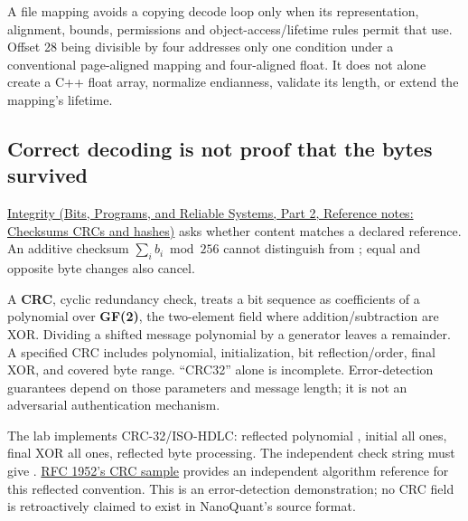 A file mapping avoids a copying decode loop only when its representation, alignment, bounds, permissions and object-access/lifetime rules permit that use. Offset 28 being divisible by four addresses only one condition under a conventional page-aligned mapping and four-aligned float. It does not alone create a C++ float array, normalize endianness, validate its length, or extend the mapping's lifetime.

\subsection{Correct decoding is not proof that the bytes survived}\label{05-engine-i-ch002-correct-decoding-is-not-proof-that-the-bytes-survived}

\hypertarget{05-engine-i-ch002-correct-decoding-is-not-proof-that-the-bytes-survived}{}

\href{../01-Bits-Programs-and-Reliable-Systems-P02/main.pdf\#appendix-ed338677de0a}{Integrity (Bits, Programs, and Reliable Systems, Part 2, Reference notes: Checksums CRCs and hashes)} asks whether content matches a declared reference. An additive checksum \(\sum_i b_i\bmod256\) cannot distinguish  from ; equal and opposite byte changes also cancel.

A \textbf{CRC}, cyclic redundancy check, treats a bit sequence as coefficients of a polynomial over \textbf{GF(2)}, the two-element field where addition/subtraction are XOR. Dividing a shifted message polynomial by a generator leaves a remainder. A specified CRC includes polynomial, initialization, bit reflection/order, final XOR, and covered byte range. ``CRC32'' alone is incomplete. Error-detection guarantees depend on those parameters and message length; it is not an adversarial authentication mechanism.

The lab implements CRC-32/ISO-HDLC: reflected polynomial , initial all ones, final XOR all ones, reflected byte processing. The independent check string  must give . \href{https://www.rfc-editor.org/rfc/rfc1952\#section-8}{RFC 1952's CRC sample} provides an independent algorithm reference for this reflected convention. This is an error-detection demonstration; no CRC field is retroactively claimed to exist in NanoQuant's source format.

